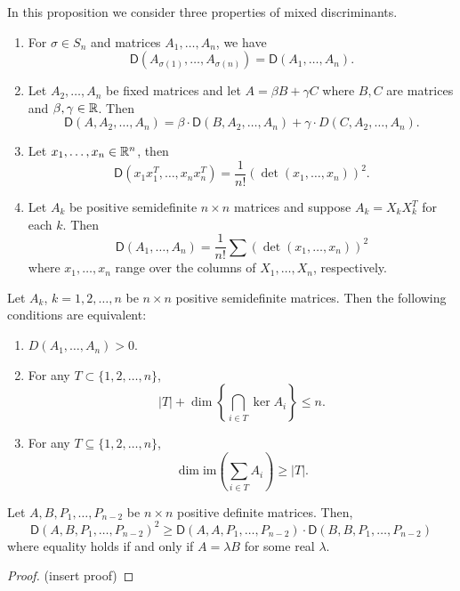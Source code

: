 \documentclass[12pt]{article}
\begin{document}
\begin{prop} \label{mixed-discriminant-properties}
	In this proposition we consider three properties of mixed discriminants. 
	\begin{enumerate}[label = (\alph*)]
		\item For $\sigma \in S_n$ and matrices $A_1, \ldots, A_n$, we have 
		\[
			\mathsf{D}(A_{\sigma(1)}, \ldots, A_{\sigma(n)}) = \mathsf{D} (A_1, \ldots, A_n). 
		\]
		\item Let $A_2, \ldots, A_n$ be fixed matrices and let $A = \beta B + \gamma C$ where $B, C$ are matrices and $\beta, \gamma \in \mathbb{R}$. Then 
		\[
			\mathsf{D}(A, A_2, \ldots, A_n) = \beta \cdot \mathsf{D}(B, A_2, \ldots, A_n) + \gamma \cdot D(C, A_2, \ldots, A_n). 
		\]
		\item Let $x_1, \ldots, x_n \in \mathbb{R}^n$, then 
		\[
			\mathsf{D}(x_1x_1^T, \ldots, x_nx_n^T) = \frac{1}{n!} \left ( \det (x_1, \ldots, x_n) \right )^2. 
		\]
		\item Let $A_k$ be positive semidefinite $n \times n$ matrices and suppose $A_k = X_k X_k^T$ for each $k$. Then 
		\[
			\mathsf{D}(A_1, \ldots, A_n) = \frac{1}{n!} \sum \left ( \det (x_1, \ldots, x_n) \right )^2
		\]
		where $x_1, \ldots, x_n$ range over the columns of $X_1, \ldots, X_n$, respectively. 
	\end{enumerate}
\end{prop}

\begin{thm}
	Let $A_k$, $k = 1, 2, \ldots, n$ be $n \times n$ positive semidefinite matrices. Then the following conditions are equivalent:
	\begin{enumerate}[label = (\alph*)]
		\item $D(A_1, \ldots, A_n) > 0$. 
		\item For any $T \subset \{1, 2, \ldots, n \}$,
		\[
			|T| + \dim \left \{ \bigcap_{i \in T} \ker A_i \right \} \leq n. 
		\]
		\item For any $T \subseteq \{1, 2, \ldots, n\}$, 
		\[
			\dim \text{im} \left ( \sum_{i \in T} A_i \right ) \geq |T|. 
		\]
	\end{enumerate}
\end{thm}

\begin{thm}
	Let $A, B, P_1, \ldots, P_{n-2}$ be $n \times n$ positive definite matrices. Then, 
	\[
		\mathsf{D}(A, B, P_1, \ldots, P_{n-2})^2 \geq \mathsf{D}(A, A, P_1, \ldots, P_{n-2}) \cdot \mathsf{D}(B, B, P_1, \ldots, P_{n-2})
	\]
	where equality holds if and only if $A = \lambda B$ for some real $\lambda$. 
\end{thm}
\begin{proof}
	(insert proof)
\end{proof}
\end{document}
